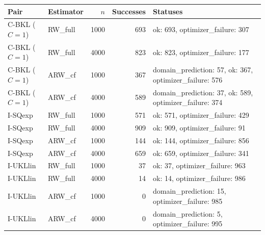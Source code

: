 \begin{tabular}{llrrl}
\hline
Pair & Estimator & $n$ & Successes & Statuses \\
\hline
C-BKL ($C=1$) & RW\_full & 1000 & 693 & ok: 693, optimizer\_failure: 307 \\
C-BKL ($C=1$) & RW\_full & 4000 & 823 & ok: 823, optimizer\_failure: 177 \\
C-BKL ($C=1$) & ARW\_cf & 1000 & 367 & domain\_prediction: 57, ok: 367, optimizer\_failure: 576 \\
C-BKL ($C=1$) & ARW\_cf & 4000 & 589 & domain\_prediction: 37, ok: 589, optimizer\_failure: 374 \\
I-SQexp & RW\_full & 1000 & 571 & ok: 571, optimizer\_failure: 429 \\
I-SQexp & RW\_full & 4000 & 909 & ok: 909, optimizer\_failure: 91 \\
I-SQexp & ARW\_cf & 1000 & 144 & ok: 144, optimizer\_failure: 856 \\
I-SQexp & ARW\_cf & 4000 & 659 & ok: 659, optimizer\_failure: 341 \\
I-UKLlin & RW\_full & 1000 & 37 & ok: 37, optimizer\_failure: 963 \\
I-UKLlin & RW\_full & 4000 & 14 & ok: 14, optimizer\_failure: 986 \\
I-UKLlin & ARW\_cf & 1000 & 0 & domain\_prediction: 15, optimizer\_failure: 985 \\
I-UKLlin & ARW\_cf & 4000 & 0 & domain\_prediction: 5, optimizer\_failure: 995 \\
\hline
\end{tabular}
